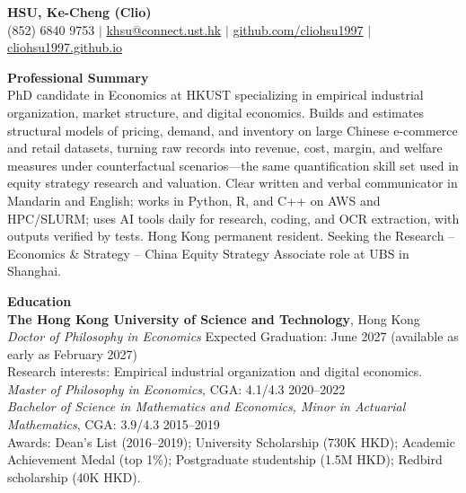 \documentclass[11pt,letterpaper]{article}
\begin{document}
{\Large \textbf{HSU, Ke-Cheng (Clio)}}\\[1pt]
(852) 6840 9753 \quad $|$ \quad \href{mailto:khsu@connect.ust.hk}{khsu@connect.ust.hk} \quad $|$ \quad \href{https://github.com/cliohsu1997}{github.com/cliohsu1997} \quad $|$ \quad \href{https://cliohsu1997.github.io/}{cliohsu1997.github.io}

\vspace{0.15pt}

{\large \textbf{Professional Summary}}\\[-0.5pt]
PhD candidate in Economics at HKUST specializing in empirical industrial organization, market structure, and digital economics. Builds and estimates structural models of pricing, demand, and inventory on large Chinese e-commerce and retail datasets, turning raw records into revenue, cost, margin, and welfare measures under counterfactual scenarios---the same quantification skill set used in equity strategy research and valuation. Clear written and verbal communicator in Mandarin and English; works in Python, R, and C++ on AWS and HPC/SLURM; uses AI tools daily for research, coding, and OCR extraction, with outputs verified by tests. Hong Kong permanent resident. Seeking the Research -- Economics \& Strategy -- China Equity Strategy Associate role at UBS in Shanghai.

\vspace{0.15pt}

{\large \textbf{Education}}\\[-0.5pt]
\textbf{The Hong Kong University of Science and Technology}, Hong Kong\\
\textit{Doctor of Philosophy in Economics} \hfill Expected Graduation: June 2027 (available as early as February 2027)\\
Research interests: Empirical industrial organization and digital economics.\\
\textit{Master of Philosophy in Economics}, CGA: 4.1/4.3 \hfill 2020--2022\\
\textit{Bachelor of Science in Mathematics and Economics, Minor in Actuarial Mathematics}, CGA: 3.9/4.3 \hfill 2015--2019\\
Awards: Dean's List (2016--2019); University Scholarship (730K HKD); Academic Achievement Medal (top 1\%); Postgraduate studentship (1.5M HKD); Redbird scholarship (40K HKD).

\vspace{0.15pt}
\end{document}
